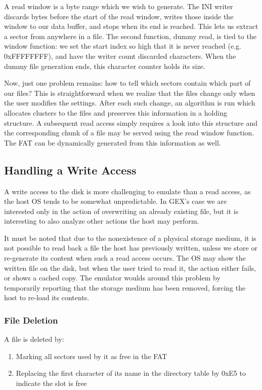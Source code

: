 A read window is a byte range which we wish to generate. The INI writer discards bytes before the start of the read window, writes those inside the window to our data buffer, and stops when its end is reached. This lets us extract a sector from anywhere in a file. The second function, dummy read, is tied to the window function: we set the start index so high that it is never reached (e.g. 0xFFFFFFFF), and have the writer count discarded characters. When the dummy file generation ends, this character counter holds its size.

Now, just one problem remains: how to tell which sectors contain which part of our files? This is straightforward when we realize that the files change only when the user modifies the settings. After each such change, an algorithm is run which allocates clusters to the files and preserves this information in a holding structure. A subsequent read access simply requires a look into this structure and the corresponding chunk of a file may be served using the read window function. The \gls{FAT} can be dynamically generated from this information as well.

\subsection{Handling a Write Access}

A write access to the disk is more challenging to emulate than a read access, as the host OS tends to be somewhat unpredictable. In GEX's case we are interested only in the action of overwriting an already existing file, but it is interesting to also analyze other actions the host may perform.

It must be noted that due to the nonexistence of a physical storage medium, it is not possible to read back a file the host has previously written, unless we store or re-generate its content when such a read access occurs. The \gls{OS} may show the written file on the disk, but when the user tried to read it, the action either fails, or shows a cached copy. The emulator woulds around this problem by temporarily reporting that the storage medium has been removed, forcing the host to re-load its contents.

\subsubsection{File Deletion}

A file is deleted by:

\begin{enumerate}
	\item Marking all sectors used by it as free in the \gls{FAT}
	\item Replacing the first character of its name in the directory table by 0xE5 to indicate the slot is free
\end{enumerate}

